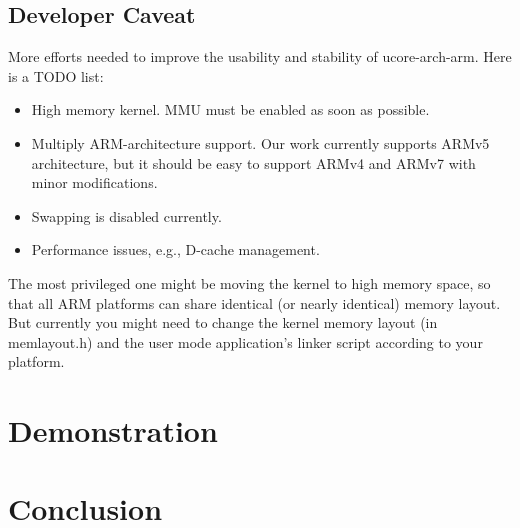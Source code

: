 \documentclass[a4paper]{article}
\begin{document}
\subsection{Developer Caveat}
More efforts needed to improve the usability and stability of ucore-arch-arm. Here is a TODO list:
\begin{itemize}
  \item High memory kernel. MMU must be enabled as soon as possible.
  \item Multiply ARM-architecture support. Our work currently supports
    ARMv5 architecture, but it should be easy to support ARMv4 and ARMv7
    with minor modifications.
  \item Swapping is disabled currently.
  \item Performance issues, e.g., D-cache management.
\end{itemize}

The most privileged one might be moving the kernel to high memory space, so that all ARM platforms
can share identical (or nearly identical) memory layout. But currently you might need to change
the kernel memory layout (in memlayout.h) and the user mode application's linker script 
according to your platform.

\section{Demonstration}

\section{Conclusion}
\end{document}
